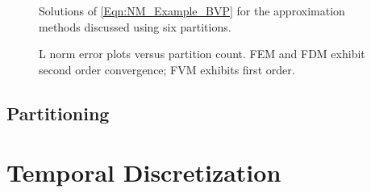 \documentclass[12pt]{../UWMadThesis}
\begin{document}
\begin{figure}%
    \centering
    \caption{Solutions of \cref{Eqn:NM_Example_BVP} for the approximation methods discussed using six partitions.}
    \label{Fig:NM_Example_ApproximationComparison}
\end{figure}
\begin{figure}%
    \centering
    \caption{L norm error plots versus partition count. FEM and FDM exhibit second order convergence; FVM exhibits first order.}%
    \label{Fig:NM_Example_ApproximationComparisonError}
\end{figure}


\subsection{Partitioning}



\section{Temporal Discretization}
\end{document}
